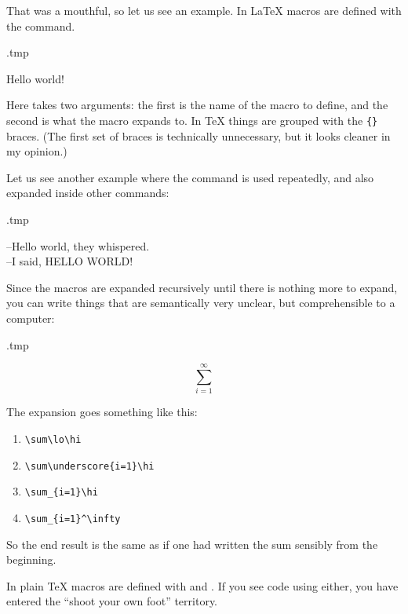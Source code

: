 That was a mouthful, so let us see an example.
In \LaTeX{} macros are defined with the  command.

\begin{VerbatimOut}{\jobname.tmp}
\newcommand{\hello}{Hello world!}

\hello
\end{VerbatimOut}
\ShowExample

Here  takes two arguments:
the first is the name of the macro to define, and the second is what the macro expands to.
In \TeX{} things are grouped with the \verb|{}| braces.
(The first set of braces is technically unnecessary, but it looks cleaner in my opinion.)

Let us see another example where the command is used repeatedly,
and also expanded inside other commands:
\begin{VerbatimOut}{\jobname.tmp}
\newcommand{\hello}{Hello world}

--\hello, they whispered.\\
--I said, \MakeUppercase{\hello}!
\end{VerbatimOut}
\ShowExample

Since the macros are expanded recursively until there is nothing more to expand,
you can write things that are semantically very unclear,
but comprehensible to a computer:
\begin{VerbatimOut}{\jobname.tmp}
\newcommand{\hi}{^\infty}
\newcommand{\underscore}{_}
\newcommand{\lo}{\underscore{i=1}}

\[ \sum\lo\hi \]
\end{VerbatimOut}
\ShowExample
%
The expansion goes something like this:
\begin{enumerate}
    \item \verb|\sum\lo\hi|
    \item \verb|\sum\underscore{i=1}\hi|
    \item \verb|\sum_{i=1}\hi|
    \item \verb|\sum_{i=1}^\infty|
\end{enumerate}
So the end result is the same as if one had written the sum sensibly from the beginning.



\begin{warning}
In plain \TeX{} macros are defined with  and .
If you see code using either,
you have entered the ``shoot your own foot'' territory.\footnotemark
\end{warning}


